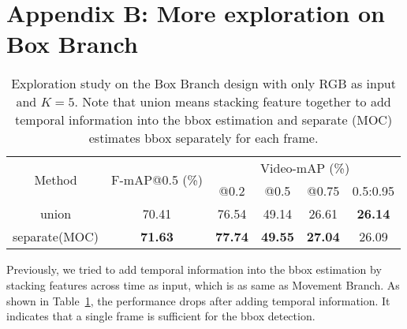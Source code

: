 \documentclass[runningheads]{llncs}
\begin{document}
\section*{Appendix B: More exploration on Box Branch}
\begin{table}
  \caption{Exploration study on the Box Branch design with only RGB as input and $K = 5$. Note that union means stacking feature together to add temporal information into the bbox estimation and separate (MOC) estimates bbox separately for each frame.}
    \label{tbl:box}
  \begin{center}
\begin{tabular}{c|c|cccc}
  \hline
  \multirow{2}{*}{Method}&\multirow{2}{*}{F-mAP@0.5 (\%)}&\multicolumn{4}{c}{Video-mAP (\%)} \\
  \cline{3-6}
  \iftrue
  & & @0.2 & @0.5 & @0.75 & 0.5:0.95\\
  \hline
  union&70.41&76.54&49.14&26.61&\bf26.14\\
  separate(MOC)&\bf 71.63&\bf 77.74&\bf 49.55&\bf 27.04&26.09\\
  \fi
  \hline
  \end{tabular}
\end{center}
\end{table}

Previously, we tried to add temporal information into the bbox estimation by stacking features across time as input, which is as same as Movement Branch. As shown in Table~\ref{tbl:box}, the performance drops after adding temporal information. It indicates that a single frame is sufficient for the bbox detection.
\end{document}

